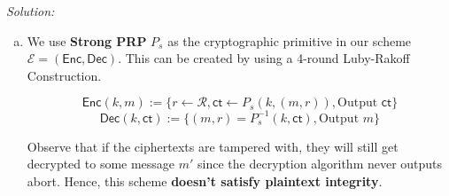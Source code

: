\documentclass[a4paper, 11pt]{article}
\newenvironment{solution}
    {\textit{Solution:}}
    {\clearpage}
\newcommand{\ct}{\mathsf{ct}}
\newcommand{\hyb}{\mathsf{Hyb}}
\newcommand{\enc}{\mathsf{Enc}}
\newcommand{\dec}{\mathsf{Dec}}
\newcommand{\calA}{\mathcal{A}}
\newcommand{\calB}{\mathcal{B}}
\newcommand{\calC}{\mathcal{C}}
\newcommand{\calE}{\mathcal{E}}
\newcommand{\calM}{\mathcal{M}}
\newcommand{\calR}{\mathcal{R}}
\begin{document}
\begin{solution}
\begin{enumerate}[(a)]
\begin{proof}
                  Let the number of queries made by $\calA$ be $Q$ and the message space be $\calM$.

                  Now, if the challenger chooses $b=0$ then it is the same as the CT-INT game.  $$\Pr[b'=0|b=0]=p_\hyb$$
                  If challenger choose $b=1$ then for all its queries, $\calA$ gets the encryption of a random message $m$. The probability of outputing 0 here will be bounded by the probability that $m\in\{m_i\}$ which is
                  $$\Pr[\exists m_i : m=m_i]\leq\frac{Q}{|\calM|}$$
                  Thus, $$\Pr[b'=0|b=1]\leq \frac{Q}{|\calM|}$$
                  $$\mathsf{CCAAdv}[\calB, \calC]\geq p_\hyb-\frac{Q}{|\calM|}$$
                  Which is non-negligible assuming $\calM$ to be superpolynomial.
              \end{proof}
        \item We use \textbf{Strong PRP} $P_s$ as the cryptographic primitive in our scheme $\calE=(\enc,\dec)$. This can be created by using a 4-round Luby-Rakoff Construction.

              $$\enc(k,m):=\{r\gets\calR, \ct\gets P_s(k,(m,r)),\text{Output } \ct\}$$
              $$\dec(k,\ct):=\{(m,r)=P_s^{-1}(k,\ct), \text{Output } m\}$$

              Observe that if the ciphertexts are tampered with, they will still get decrypted to some message $m'$ since the decryption algorithm never outputs abort. Hence, this scheme \textbf{doesn't satisfy plaintext integrity}.



\end{enumerate}
\end{solution}
\end{document}
